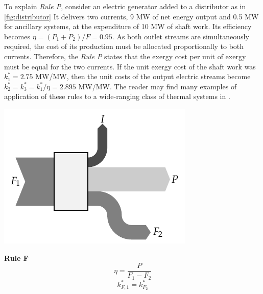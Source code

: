 \documentclass[energies,article,submit,moreauthors,pdftex]{Definitions/mdpi}
\begin{document}
To explain \emph{Rule P}, consider an electric generator added to a distributor as in \cref{fig:distributor} It delivers two currents, 9 MW of net energy output and 0.5 MW for ancillary systems, at the expenditure of 10 MW of shaft work. Its efficiency becomes  $\eta= (P_1 + P_2)/F=0.95$. As both outlet streams are simultaneously required, the cost of its production must be allocated proportionally to both currents. Therefore, the \emph{Rule P} states that the exergy cost per unit of exergy must be equal for the two currents. If the unit exergy cost of the shaft work was $k_1^*=2.75$ MW/MW, then the  unit costs of the output electric streams become $k_2^*=k_3^*=k_1^*/\eta=2.895$ MW/MW. The reader may find many examples of application of these rules to a wide-ranging class of thermal systems in \cite{Moran1996}.

\begin{center}
	\begin{minipage}[c]{0.50\linewidth}
		\includegraphics{reglaF.pdf}
	\end{minipage}
	\begin{minipage}[c]{0.45\linewidth}
		\centering
		\textbf{Rule F}
		\begin{equation*}
		\eta=\frac{P}{F_1-F_2}
		\end{equation*}
		\begin{equation*}
		k_{F,1}^*=k_{F_2}^*
		\end{equation*}
	\end{minipage}
	\label{fig:RulesFP}
\end{center}
\end{document}
